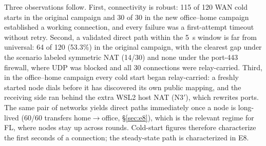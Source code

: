 Three observations follow. First, connectivity is robust: 115 of 120 WAN cold starts in the original campaign and 30 of 30 in the new office--home campaign established a working connection, and every failure was a first-attempt timeout without retry. Second, a validated direct path within the 5~s window is far from universal: 64 of 120 (53.3\%) in the original campaign, with the clearest gap under the scenario labeled symmetric NAT (14/30) and none under the port-443 firewall, where UDP was blocked and all 30 connections were relay-carried. Third, in the office--home campaign every cold start began relay-carried: a freshly started node dials before it has discovered its own public mapping, and the receiving side ran behind the extra WSL2 host NAT (N3$'$), which rewrites ports. The same pair of networks yields direct paths immediately once a node is long-lived (60/60 transfers home$\to$office, \S\ref{sec:e8}), which is the relevant regime for FL, where nodes stay up across rounds. Cold-start figures therefore characterize the first seconds of a connection; the steady-state path is characterized in E8.

